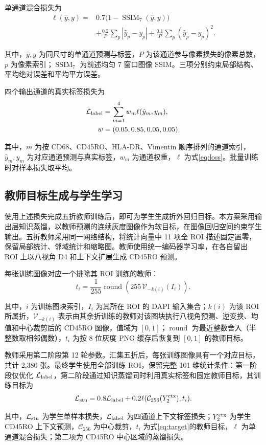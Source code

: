 \documentclass[UTF8,a4paper,zihao=5,fontset=fandol]{ctexart}
\newcommand{\op}[1]{\operatorname{#1}}
\newcommand{\sym}[1]{\par\nobreak\noindent\begin{minipage}{\linewidth}#1\end{minipage}\par}
\begin{document}
单通道混合损失为
\begin{equation}
\begin{aligned}
\ell(\hat y,y)={}&0.7\bigl(1-\op{SSIM}_7(\hat y,y)\bigr)\\
&+\frac{0.2}{P}\sum_p|\hat y_p-y_p|
+\frac{0.1}{P}\sum_p(\hat y_p-y_p)^2.
\end{aligned}
\label{eq:loss}
\end{equation}
\sym{其中，$\hat y,y$ 为同尺寸的单通道预测与标签，$P$ 为该通道参与像素损失的像素总数，$p$ 为像素索引；$\op{SSIM}_7$ 为前述均匀 7 窗口图像 SSIM。三项分别约束局部结构、平均绝对误差和平均平方误差。}

四个输出通道的真实标签损失为
\begin{equation}
\begin{aligned}
\mathcal L_{\rm label}&=\sum_{m=1}^{4}w_m\ell(\hat y_m,y_m),\\
w&=(0.05,0.85,0.05,0.05).
\end{aligned}
\label{eq:multimarker}
\end{equation}
\sym{其中，$m$ 为按 CD68、CD45RO、HLA-DR、Vimentin 顺序排列的通道索引，$\hat y_m,y_m$ 为对应通道预测与真实标签，$w_m$ 为通道权重，$\ell$ 为式\eqref{eq:loss}。批量训练时对样本损失取平均。}

\subsection{教师目标生成与学生学习}
使用上述损失完成五折教师训练后，即可为学生生成折外回归目标。本方案采用输出层知识蒸馏\cite{distill}，以教师预测的连续灰度图像作为软目标，在图像回归空间约束学生输出。五折教师采用同一网络结构，将统计向量中 11 项全 ROI 描述固定置零，保留局部统计、邻域统计和缩略图。教师使用统一编码器学习率，在各自留出 ROI 上以八视角 D4 和上下文扩展生成 CD45RO 预测。

每张训练图像对应一个排除其 ROI 训练的教师：
\begin{equation}
t_i=\frac{1}{255}\op{round}\!\left(255\,
\mathcal V_{-k(i)}(I_i)\right).
\label{eq:target}
\end{equation}
\sym{其中，$i$ 为训练图块索引，$I_i$ 为其所在 ROI 的 DAPI 输入集合；$k(i)$ 为该 ROI 所属折，$\mathcal V_{-k(i)}$ 表示由其余折训练的教师对该图块执行八视角预测、逆变换、均值和中心裁剪后的 CD45RO 图像，值域为 $[0,1]$；$\op{round}$ 为最近整数舍入（半整数取相邻偶数），$t_i$ 为按 8 位灰度 PNG 缓存后恢复到 $[0,1]$ 的教师目标。}
教师采用第二阶段第 12 轮参数。汇集五折后，每张训练图像具有一个对应目标，共计 2,380 张。最终学生使用全部训练 ROI，保留完整 101 维统计条件：第一阶段仅优化 $\mathcal L_{\rm label}$，第二阶段通过知识蒸馏同时利用真实标签和固定教师目标，其训练目标为
\begin{equation}
\mathcal L_{\rm stu}=0.8\mathcal L_{\rm label}
+0.2\ell(\mathcal C_{256}(Y^{\rm ctx}_2),t_i).
\label{eq:student}
\end{equation}
\sym{其中，$\mathcal L_{\rm stu}$ 为学生单样本损失，$\mathcal L_{\rm label}$ 为四通道上下文标签损失；$Y^{\rm ctx}_2$ 为学生 CD45RO 上下文预测，$\mathcal C_{256}$ 为中心裁剪，$t_i$ 为式\eqref{eq:target}的教师目标，$\ell$ 为单通道混合损失；第二项为 CD45RO 中心区域的蒸馏损失。}
\end{document}
